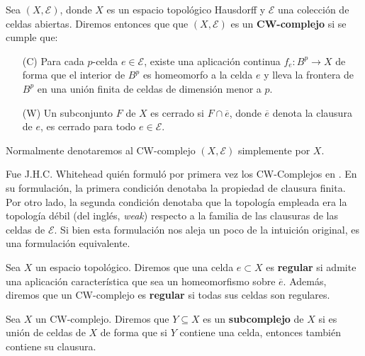 \begin{definicion}
	Sea \((X,\mathcal{E})\), donde \(X\) es un espacio topológico Hausdorff y \(\mathcal{E}\) una colección de celdas abiertas. 
	Diremos entonces que que \((X,\mathcal{E})\) es un \textbf{CW-complejo} si se cumple que:
	\begin{enumerate}[font=\bfseries]
		\item[(C)] Para cada \(p\)-celda \(e \in \mathcal{E}\), existe una aplicación continua 
		\(f_e : B^p \to X\) de forma que el interior de \(B^p\) es homeomorfo a la celda \(e\) y lleva 
		la frontera de \(B^p\) en una unión finita de celdas de dimensión menor a \(p\).
		\item[(W)] Un subconjunto \(F\) de \(X\) es cerrado si \(F \cap \overline{e}\), donde \(\overline{e}\) denota 
		la clausura de \(e\), es cerrado para todo \(e \in \mathcal{E}\).
	\end{enumerate}
	Normalmente denotaremos al CW-complejo \((X,\mathcal{E})\) simplemente por \(X\).
\end{definicion}
\begin{observacion}
	Fue J.H.C. Whitehead quién formuló por primera vez los CW-Complejos en \cite{MR0030759}. En su formulación, la primera condición denotaba la propiedad de clausura finita. Por otro lado, la segunda condición denotaba que la topología empleada era la topología débil (del inglés, \textit{weak}) respecto a la familia de las clausuras de las celdas de $\mathcal{E}$. Si bien esta formulación nos aleja un poco de la intuición original, es una formulación equivalente.
\end{observacion}

\begin{definicion}
	Sea \(X\) un espacio topológico. Diremos que una celda \(e \subset X\) es \textbf{regular} si admite 
	una aplicación característica que sea un homeomorfismo sobre \(\overline{e}\). Además, diremos que un CW-complejo es \textbf{regular} si todas sus celdas son regulares.
\end{definicion}

\begin{definicion}
	Sea \(X\) un CW-complejo. Diremos que \(Y \subseteq X\) es un \textbf{subcomplejo} de \(X\) si es 
	unión de celdas de \(X\) de forma que si \(Y\) contiene una celda, entonces también contiene 
	su clausura.
\end{definicion}

